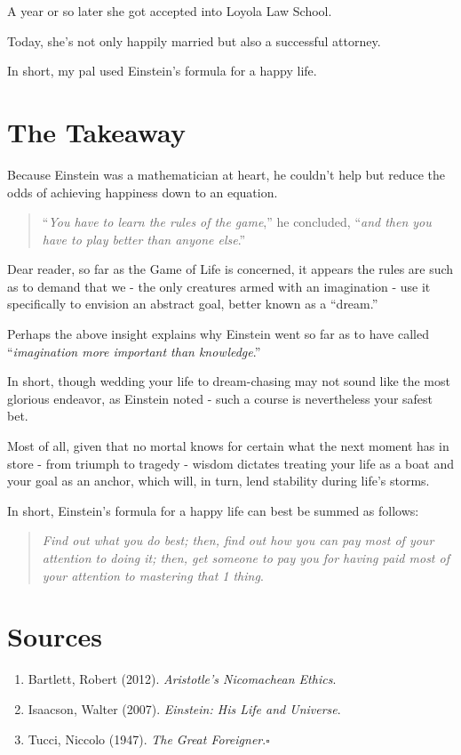 \documentclass{book}
\numberwithin{equation}{section}
\begin{document}
A year or so later she got accepted into Loyola Law School.

%
Today, she's not only happily married but also a successful attorney.

In short, my pal used Einstein's formula for a happy life.

\section{The Takeaway}
Because Einstein was a mathematician at heart, he couldn't help but reduce the odds of achieving happiness down to an equation.

\begin{quotation}
    ``\textit{You have to learn the rules of the game},'' he concluded, ``\textit{and then you have to play better than anyone else}.''
\end{quotation}
Dear reader, so far as the Game of Life is concerned, it appears the rules are such as to demand that we - the only creatures armed with an imagination - use it specifically to envision an abstract goal, better known as a ``dream.''

%
Perhaps the above insight explains why Einstein went so far as to have called ``\textit{imagination more important than knowledge}.''

In short, though wedding your life to dream-chasing may not sound like the most glorious endeavor, as Einstein noted - such a course is nevertheless your safest bet.

%
Most of all, given that no mortal knows for certain what the next moment has in store - from triumph to tragedy - wisdom dictates treating your life as a boat and your goal as an anchor, which will, in turn, lend stability during life's storms.

%
In short, Einstein's formula for a happy life can best be summed as follows:

\begin{quotation}
    \textit{Find out what you do best; then, find out how you can pay most of your attention to doing it; then, get someone to pay you for having paid most of your attention to mastering that 1 thing}.
\end{quotation}

\section{Sources}
\begin{enumerate}
    \item Bartlett, Robert (2012). \textit{Aristotle's Nicomachean Ethics}.
    \item Isaacson, Walter (2007). \textit{Einstein: His Life and Universe}.
    \item Tucci, Niccolo (1947). \textit{The Great Foreigner}.\hfill$\square$
\end{enumerate}
\end{document}
